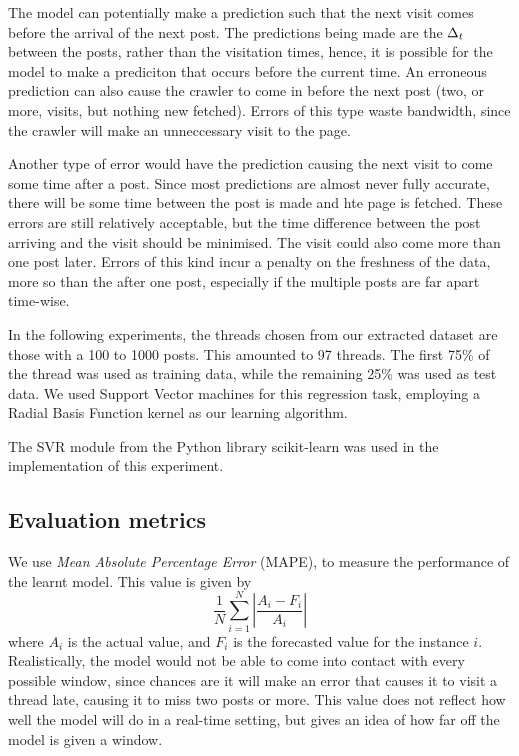 \documentclass[12 pt]{article}
\begin{document}
The model can potentially make a prediction such that the next visit comes before the arrival of the next post. The predictions being made are the $\Delta_t$ between the posts, rather than the visitation times, hence, it is possible for the model to make a prediciton that occurs before the current time. An erroneous prediction can also cause the crawler to come in before the next post (two, or more, visits, but nothing new fetched). Errors of this type waste bandwidth, since the crawler will make an unneccessary visit to the page.

Another type of error would have the prediction causing the next visit to come some time after a post. Since most predictions are almost never fully accurate, there will be some time between the post is made and hte page is fetched. These errors are still relatively acceptable, but the time difference between the post arriving and the visit should be minimised. The visit could also come more than one post later. Errors of this kind incur a penalty on the freshness of the data, more so than the after one post, especially if the multiple posts are far apart time-wise.


In the following experiments, the threads chosen from our extracted dataset are those with a 100 to 1000 posts. This amounted to 97 threads. The first 75\% of the thread was used as training data, while the remaining 25\% was used as test data. We used Support Vector machines for this regression task, employing a Radial Basis Function kernel as our learning algorithm. 

The SVR module from the Python library scikit-learn was used in the implementation of this experiment.



\subsection{Evaluation metrics}
We use \emph{Mean Absolute Percentage Error} (MAPE), to measure the performance of the learnt model. This value is given by
\[
	\frac{1}{N}\sum^N_{i=1}\left|\frac{A_i-F_i}{A_i}\right|
\]
where $A_i$ is the actual value, and $F_i$ is the forecasted value for the instance $i$. Realistically, the model would not be able to come into contact with every possible window, since chances are it will make an error that causes %
it to visit a thread late, causing it to miss two posts or more. This value does not reflect how well the model will do in a real-time setting, but gives an idea of how far off the model is given a window. 
\end{document}
